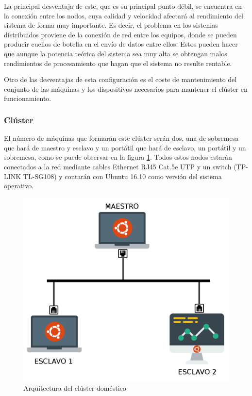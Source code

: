 La principal desventaja de este, que es su principal punto débil, se encuentra en la conexión entre los nodos, cuya calidad y velocidad afectará al rendimiento del sistema de forma muy importante. Es decir, el problema en los sistemas distribuidos proviene de la conexión de red entre los equipos, donde se pueden producir cuellos de botella en el envío de datos entre ellos. Estos pueden hacer que aunque la potencia teórica del sistema sea muy alta se obtengan malos rendimientos de procesamiento que hagan que el sistema no resulte rentable.

Otro de las desventajas de esta configuración es el coste de mantenimiento del conjunto de las máquinas y los dispositivos necesarios para mantener el clúster en funcionamiento.

\subsubsection{Clúster  \label{disDomestico}}
El número de máquinas que formarán este clúster serán dos, una de sobremesa que hará de maestro y esclavo y un portátil que hará de esclavo, un portátil y un sobremesa, como se puede observar en la figura \ref{fig:clusterDomestico}. Todos estos nodos estarán conectados a la red mediante cables Ethernet RJ45 Cat.5e UTP y un switch (TP-LINK TL-SG108) y contarán con Ubuntu 16.10 \cite{ubuntu} como versión del sistema operativo.

\begin{figure}[htp!]
	\centering
	\caption{Arquitectura del clúster doméstico}
	\label{fig:clusterDomestico}
	\includegraphics[scale=0.3]{graphics/clusterDomestico}
\end{figure}

